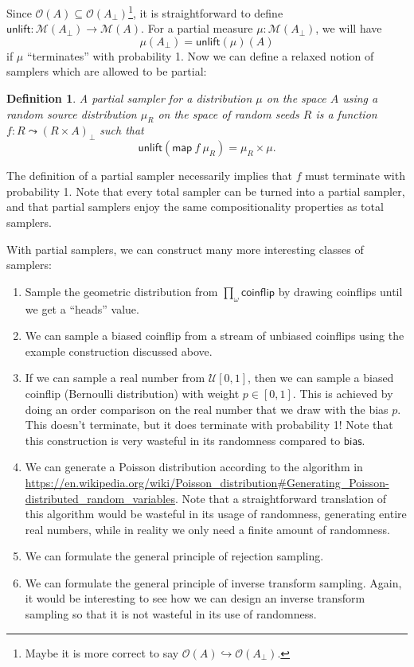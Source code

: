 \documentclass{article}           %
\newtheorem{definition}{Definition}
\newcommand{\Dist}[1]{\mathcal{M}({#1})}
\newcommand{\Open}[1]{\mathcal{O}({#1})}
\newcommand{\coinflip}{\mathsf{coinflip}}
\begin{document}
Since $\Open{A} \subseteq \Open{A_\bot}$\footnote{Maybe it is more correct to say $\Open{A} \hookrightarrow \Open{A_\bot}$.}, it is straightforward to define $\mathsf{unlift} : \Dist{A_\bot} \to \Dist{A}$. For a partial measure $\mu : \Dist{A_\bot}$, we will have
\[
\mu(A_\bot) = \mathsf{unlift}(\mu)(A)
\]
if $\mu$ ``terminates'' with probability 1. Now we can define a relaxed notion of samplers which are allowed to be partial:

\begin{definition}
A \emph{partial sampler} for a distribution $\mu$ on the space $A$ using a random source distribution $\mu_R$ on the space of random seeds $R$ is a function $ f : R \leadsto \left(R \times A \right)_\bot$ such that
\[
 \mathsf{unlift}\left(\mathsf{map}\ f \ \mu_R\right) = \mu_R \times \mu.
\]
\end{definition}

The definition of a partial sampler necessarily implies that $f$ must terminate with probability 1. Note that every total sampler can be turned into a partial sampler, and that partial samplers enjoy the same compositionality properties as total samplers.

With partial samplers, we can construct many more interesting classes of samplers:

\begin{enumerate}
\item Sample the geometric distribution from $\prod_\omega \coinflip$ by drawing coinflips until we get a ``heads'' value.
\item We can sample a biased coinflip from a stream of unbiased coinflips using the example construction discussed above.
\item If we can sample a real number from $\mathcal{U}[0,1]$, then we can sample a biased coinflip (Bernoulli distribution) with weight $p \in [0,1]$. This is achieved by doing an order comparison on the real number that we draw with the bias $p$. This doesn't terminate, but it does terminate with probability 1! Note that this construction is very wasteful in its randomness compared to $\mathsf{bias}$.
\item We can generate a Poisson distribution according to the algorithm in \url{https://en.wikipedia.org/wiki/Poisson_distribution#Generating_Poisson-distributed_random_variables}. Note that a straightforward translation of this algorithm would be wasteful in its usage of randomness, generating entire real numbers, while in reality we only need a finite amount of randomness.
\item We can formulate the general principle of rejection sampling.
\item We can formulate the general principle of inverse transform sampling. Again, it would be interesting to see how we can design an inverse transform sampling so that it is not wasteful in its use of randomness.
\end{enumerate}



\end{document}
